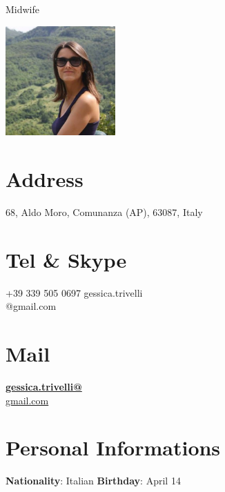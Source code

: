 \documentclass[]{friggeri-cv}
\begin{document}
      {Midwife}
      

\begin{aside}
  \includegraphics[width=4.2cm, keepaspectratio]{img/gessica_crop.jpg}
	\section{Address}
	68, Aldo Moro,
	Comunanza (AP), 63087, Italy
    ~
	\section{Tel \& Skype}
    +39 339 505 0697 \vspace{3pt}
    gessica.trivelli\\@gmail.com
    ~
	\section{Mail}
    \href{mailto:gessica.trivelli@gmail.com}{\textbf{gessica.trivelli@}\\gmail.com}
    ~
    \section{Personal Informations}
	\textbf{Nationality}: Italian
	\textbf{Birthday}: April 14
	~
\end{aside}
\vspace{1.8cm}
\end{document}

